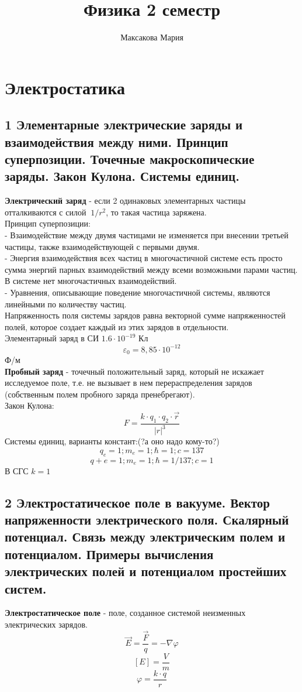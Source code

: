 \documentclass[a4paper,12pt]{article}
\author{Максакова Мария}
\title{Физика 2 семестр}
\begin{document}
\section{Электростатика}
\subsection{1   Элементарные электрические заряды и взаимодействия между ними. Принцип суперпозиции. Точечные макроскопические заряды. Закон Кулона. Системы единиц. }
\textbf{Электрический заряд} - если 2 одинаковых элементарных частицы отталкиваются с силой $~1/r^2$, то такая частица заряжена.\\
Принцип суперпозиции:\\
 - Взаимодействие между двумя частицами не изменяется при внесении третьей частицы, также взаимодействующей с первыми двумя.\\
 - Энергия взаимодействия всех частиц в многочастичной системе есть просто сумма энергий парных взаимодействий между всеми возможными парами частиц. В системе нет многочастичных взаимодействий.\\
 - Уравнения, описывающие поведение многочастичной системы, являются линейными по количеству частиц.\\
Напряженность поля системы зарядов равна векторной сумме напряженностей полей, которое создает каждый из этих зарядов в отдельности.\\
Элементарный заряд в СИ $1.6 \cdot 10^{-19}$ Кл\\
$$\varepsilon _0 = 8,85 \cdot 10^{-12}$$ Ф/м\\
\textbf{Пробный заряд} - точечный положительный заряд, который не искажает исследуемое поле, т.е. не вызывает в нем перераспределения зарядов (собственным полем пробного заряда пренебрегают).\\
Закон Кулона:\\
\begin{equation}
	F = \frac{k \cdot q_1 \cdot q_2 \cdot \vec{r}}{|r|^3}
\end{equation}
Системы единиц, варианты констант:(?а оно надо кому-то?)\\
$$q_e = 1; m_e = 1; \hbar = 1; c = 137$$
$$q+e = 1; m_e = 1; \hbar = 1/137; c = 1$$
В СГС $k = 1$\\


\subsection{2   Электростатическое поле в вакууме. Вектор напряженности электрического поля. Скалярный потенциал. Связь между электрическим полем и потенциалом. Примеры вычисления электрических полей и потенциалом простейших систем.}
\textbf{Электростатическое поле} - поле, созданное системой неизменных электрических зарядов.\\
\begin{equation}
	\vec{E} = \frac{\vec{F}}{q} = -\nabla \varphi
\end{equation}
$$[E] = \frac{V}{m}$$
\begin{equation}
	\varphi = \frac{k \cdot q}{r}
\end{equation}
\end{document}
